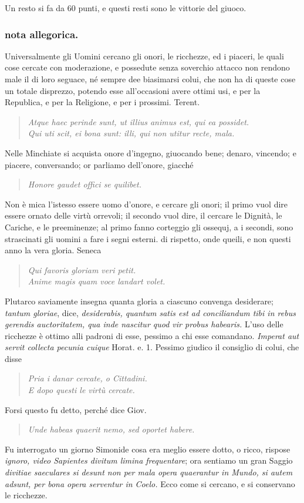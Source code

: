 \documentclass[11pt,a6paper]{article}
\newcommand{\literaryquote}[1]{%
\kern -6pt  \begin{verse}
    {\footnotesize \it #1}
  \end{verse}\kern -2pt%
}
\begin{document}
Un resto si fa da 60 punti, e questi resti
sono le vittorie del giuoco.

\subsubsection{nota allegorica.}
{\footnotesize
Universalmente gli Uomini cercano gli onori,
le ricchezze, ed i piaceri, le quali cose cercate con
moderazione, e possedute senza soverchio attacco
non rendono male il di loro seguace, né sempre dee
biasimarsi colui, che non ha di queste cose un totale
disprezzo, potendo esse all'occasioni avere ottimi
usi, e per la Republica, e per la Religione, e per
i prossimi. Terent.

\literaryquote{Atque haec perinde sunt, ut illius animus est, qui ea possidet.\\
Qui uti scit, ei bona sunt: illi, qui non utitur recte, mala.}

Nelle Minchiate si acquista onore d'ingegno, giuocando
bene; denaro, vincendo; e piacere, conversando;
or parliamo dell'onore, giacché

\literaryquote{Honore gaudet offici se quilibet.}

Non è mica l'istesso essere uomo d'onore, e
cercare gli onori; il primo vuol dire essere ornato
delle virtù orrevoli; il secondo vuol dire, il cercare
le Dignità, le Cariche, e le preeminenze; al primo
fanno corteggio gli ossequj, a i secondi, sono
strascinati gli uomini a fare i segni esterni. di rispetto,
onde queili, e non questi anno la vera gloria. Seneca

\literaryquote{Qui favoris gloriam veri petit.\\
  Anime magis quam voce landart volet.}

Plutarco saviamente insegna quanta gloria a ciascuno
convenga desiderare; \textit{tantum gloriae}, dice,
\textit{desiderabis, quantum satis est ad conciliandum tibi in
  rebus gerendis auctoritatem, qua inde nascitur
  quod vir probus habearis.}
L'uso delle ricchezze è ottimo alli padroni di
esse, pessimo a chi esse comandano. \textit{Imperat aut
servit collecta pecunia cuique} Horat. e. 1.
Pessimo giudico il consiglio di colui, che disse

\literaryquote{ Pria i danar cercate, o Cittadini.\\
 E dopo questi le virtù cercate.}

Forsi questo fu detto, perché dice Giov.

\literaryquote{Unde habeas quaerit nemo, sed oportet habere.}

Fu interrogato un giorno Simonide cosa era meglio
essere dotto, o ricco, rispose \textit{ignoro, video Sapientes
divitum limina frequentare}; ora sentiamo un gran
Saggio \textit{divitiae saeculares si desunt non per mala
 opera quaerantur in Mundo, si autem adsunt, per bona
 opera serventur in Coelo.} Ecco come si cercano, e si
conservano le ricchezze.
}
\end{document}
